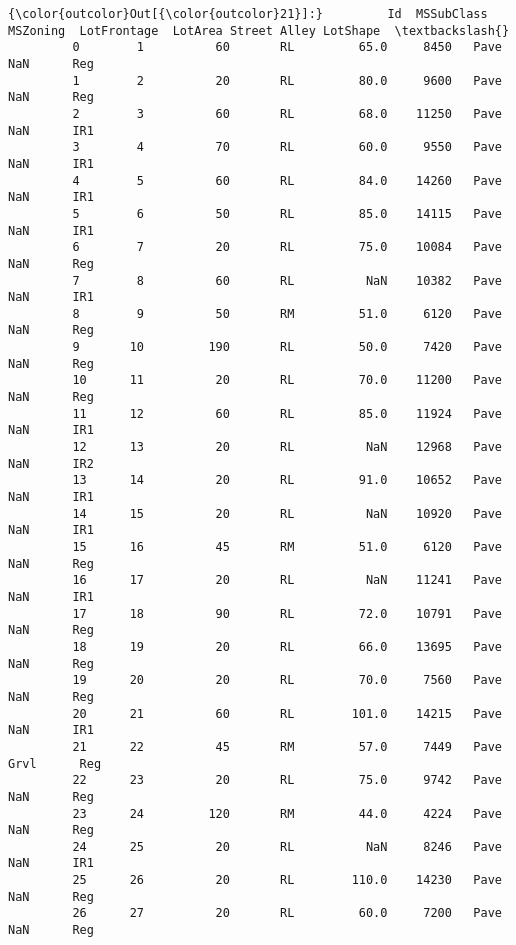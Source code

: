 \documentclass[11pt]{article}
\begin{document}
\begin{Verbatim}[commandchars=\\\{\}]
{\color{outcolor}Out[{\color{outcolor}21}]:}         Id  MSSubClass MSZoning  LotFrontage  LotArea Street Alley LotShape  \textbackslash{}
         0        1          60       RL         65.0     8450   Pave   NaN      Reg   
         1        2          20       RL         80.0     9600   Pave   NaN      Reg   
         2        3          60       RL         68.0    11250   Pave   NaN      IR1   
         3        4          70       RL         60.0     9550   Pave   NaN      IR1   
         4        5          60       RL         84.0    14260   Pave   NaN      IR1   
         5        6          50       RL         85.0    14115   Pave   NaN      IR1   
         6        7          20       RL         75.0    10084   Pave   NaN      Reg   
         7        8          60       RL          NaN    10382   Pave   NaN      IR1   
         8        9          50       RM         51.0     6120   Pave   NaN      Reg   
         9       10         190       RL         50.0     7420   Pave   NaN      Reg   
         10      11          20       RL         70.0    11200   Pave   NaN      Reg   
         11      12          60       RL         85.0    11924   Pave   NaN      IR1   
         12      13          20       RL          NaN    12968   Pave   NaN      IR2   
         13      14          20       RL         91.0    10652   Pave   NaN      IR1   
         14      15          20       RL          NaN    10920   Pave   NaN      IR1   
         15      16          45       RM         51.0     6120   Pave   NaN      Reg   
         16      17          20       RL          NaN    11241   Pave   NaN      IR1   
         17      18          90       RL         72.0    10791   Pave   NaN      Reg   
         18      19          20       RL         66.0    13695   Pave   NaN      Reg   
         19      20          20       RL         70.0     7560   Pave   NaN      Reg   
         20      21          60       RL        101.0    14215   Pave   NaN      IR1   
         21      22          45       RM         57.0     7449   Pave  Grvl      Reg   
         22      23          20       RL         75.0     9742   Pave   NaN      Reg   
         23      24         120       RM         44.0     4224   Pave   NaN      Reg   
         24      25          20       RL          NaN     8246   Pave   NaN      IR1   
         25      26          20       RL        110.0    14230   Pave   NaN      Reg   
         26      27          20       RL         60.0     7200   Pave   NaN      Reg   

\end{Verbatim}
\end{document}
